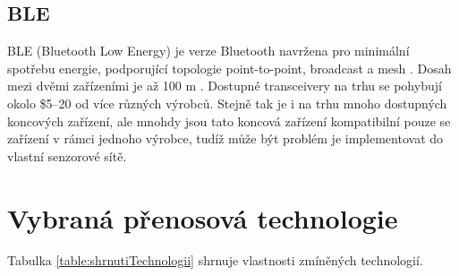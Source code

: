 \subsection{BLE}
BLE (Bluetooth Low Energy) je verze Bluetooth navržena pro minimální spotřebu energie, podporující topologie point-to-point, broadcast a mesh \cite{BT_alliance}.
Dosah mezi dvěmi zařízeními je až 100 m \cite{BT_nordic}.
Dostupné transceivery na trhu se pohybují okolo \$5–20 od více různých výrobců. Stejně tak je i na trhu mnoho dostupných koncových zařízení, ale mnohdy jsou tato koncová zařízení kompatibilní pouze se zařízení v rámci jednoho výrobce, tudíž může být problém je implementovat do vlastní senzorové sítě. 






\newpage
\section{Vybraná přenosová technologie}
Tabulka \ref{table:shrnutiTechnologii} shrnuje vlastnosti zmíněných technologií.   

  
